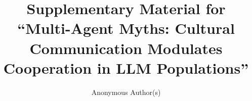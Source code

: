 \documentclass[sigconf,anonymous]{aamas}
\title{Supplementary Material for ``Multi-Agent Myths: Cultural Communication Modulates Cooperation in LLM Populations''}
\author{Anonymous Author(s)}
\begin{document}
\maketitle
\renewcommand{\thefigure}{S\arabic{figure}}
\renewcommand{\thetable}{S\arabic{table}}


\end{document}
